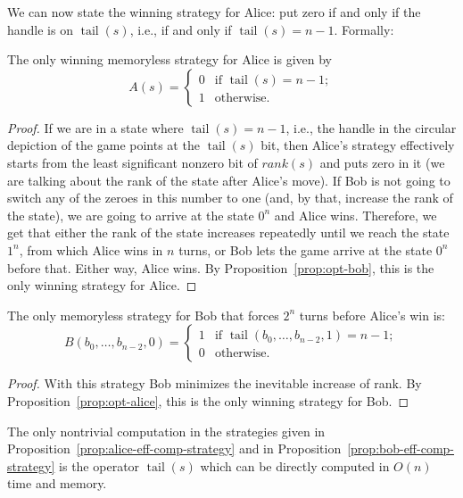 \documentclass[final,12pt]{elsarticle}
\theoremstyle{definition} \newtheorem{definition}[theorem]{Definition} \newtheorem{observation}[theorem]{Observation} \newtheorem{example}[theorem]{Example} \newtheorem{remark}[theorem]{Remark} \newtheorem{corrolary}[theorem]{Corrolary}
\DeclareMathOperator{\tail}{tail}
\begin{document}
We can now state the winning strategy for Alice: put zero if and only if the handle is on $\tail(s)$, i.e., if and only if $\tail(s)=n-1$. Formally:

\begin{proposition}
	The only winning memoryless strategy for Alice is given by  $$A(s) =
		\begin{cases}
			0 &
			\text{if } \tail(s)=n-1; \\
			1 &
			\text{otherwise.}
		\end{cases} $$
		\label{prop:alice-eff-comp-strategy}
\end{proposition}
\begin{proof}
	If we are in a state where $\tail(s)=n-1$, i.e., the handle in the circular depiction of the game points at the $\tail(s)$ bit, then Alice's strategy effectively starts from the least significant nonzero bit of $rank(s)$ and puts zero in it (we are talking about the rank of the state after Alice's move). If Bob is not going to switch any of the zeroes in this number to one (and, by that, increase the rank of the state), we are going to arrive at the state $0^n$ and Alice wins. Therefore, we get that either the rank of the state increases repeatedly until we reach the state $1^n$, from which Alice wins in $n$ turns, or Bob lets the game arrive at the state $0^n$ before that. Either way, Alice wins. By Proposition~\ref{prop:opt-bob}, this is the only winning strategy for Alice.
\end{proof}

\begin{proposition}
	The only memoryless strategy for Bob that forces $2^n$ turns before Alice's win is:
	$$B(b_0,\dots,b_{n-2},0) =
	\begin{cases}
	1 &
	\text{if } \tail(b_0,\dots,b_{n-2},1)=n-1; \\
	0 &
	\text{otherwise.}
	\end{cases} $$
	\label{prop:bob-eff-comp-strategy}
\end{proposition}
\begin{proof}
	With this strategy Bob minimizes the inevitable increase of rank. By Proposition~\ref{prop:opt-alice}, this is the only winning strategy for Bob.
\end{proof}

The only nontrivial computation in the strategies given in Proposition~\ref{prop:alice-eff-comp-strategy} and in Proposition~\ref{prop:bob-eff-comp-strategy} is the operator $\tail(s)$ which can be directly computed in $O(n)$ time and memory. 
\end{document}
